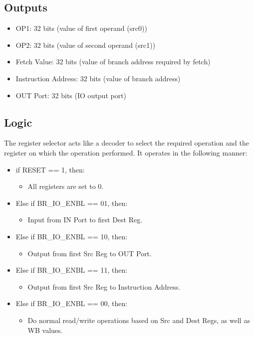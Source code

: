 \subsection{Outputs}
\begin{itemize}
    \item OP1: 32 bits (value of first operand (src0))
    \item OP2: 32 bits (value of second operand (src1))
    \item Fetch Value: 32 bits (value of branch address required by fetch)
    \item Instruction Address: 32 bits (value of branch address)
    \item OUT Port: 32 bits (IO output port)
\end{itemize}

\subsection{Logic}
The register selector acts like a decoder to select the required operation and the register on which the operation performed. It operates in the following manner:
\begin{itemize}
    \item if RESET == 1, then:
    \begin{itemize}
        \item All registers are set to 0.
    \end{itemize}
    \item Else if BR\_IO\_ENBL == 01, then:
    \begin{itemize}
        \item Input from IN Port to first Dest Reg.
    \end{itemize}
    \item Else if BR\_IO\_ENBL == 10, then:
    \begin{itemize}
        \item Output from first Src Reg to OUT Port.
    \end{itemize}
    \item Else if BR\_IO\_ENBL == 11, then:
    \begin{itemize}
        \item Output from first Src Reg to Instruction Address.
    \end{itemize}
    \item Else if BR\_IO\_ENBL == 00, then:
    \begin{itemize}
        \item Do normal read/write operations based on Src and Dest Regs, as well as WB values.
    \end{itemize}
\end{itemize}


